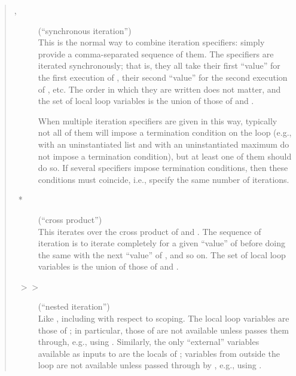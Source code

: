 \begin{quote}
\begin{description}
\item[,~] (``synchronous iteration'')%
\\
    This is the normal way to combine iteration specifiers: simply
    provide a comma-separated sequence of them.  The specifiers are
    iterated synchronously; that is, they all take their first
    ``value'' for the first execution of , their second ``value''
    for the second execution of , etc.  The order in which they
    are written does not matter, and the set of local loop variables
    is the union of those of  and .

    When multiple iteration specifiers are given in this way,
    typically not all of them will impose a termination condition on
    the loop (e.g.,  with an uninstantiated list and
     with an uninstantiated maximum do not impose a termination
    condition), but at least one of them should do so.  If several
    specifiers impose termination conditions, then these conditions
    must coincide, i.e., specify the same number of iterations.

\item[~*~] (``cross product'')%
\\
    This iterates over the cross product of  and
    .
    The sequence of iteration is to iterate  completely for a
    given ``value'' of  before doing the same with the next
    ``value'' of , and so on.  The set of local loop variables
    is the union of those of  and .

\item[~$>>$~] (``nested iteration'')%
\\
    Like , including with
    respect to scoping.  The local loop variables are those of
    ; in particular, those of  are not
    available
    unless  passes them through, e.g., using  .
    Similarly, the only ``external'' variables available as inputs to
     are the locals of ; variables from
    outside the
    loop are not available unless passed through by , e.g.,
    using  .
\end{description}
\end{quote}

